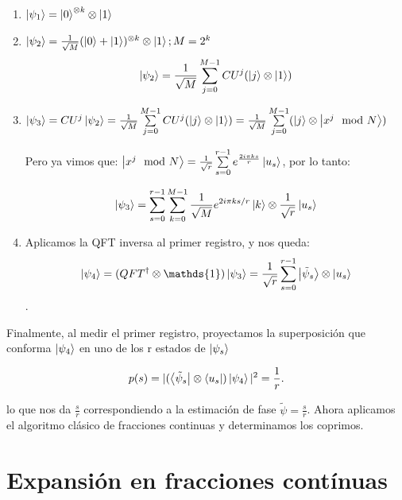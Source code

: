 \begin{enumerate}
    \item $\ket{\psi_1} = \ket{0}^{\otimes k} \otimes \ket{1}$
    \item $\ket{\psi_2} = \frac{1}{\sqrt{M}} (\ket{0} + \ket{1})^{\otimes k} \otimes \ket{1}; M=2^k$
        \begin{equation}
            \ket{\psi_2} = \frac{1}{\sqrt{M}} \sum_{j=0}^{M-1} CU^j (\ket{j} \otimes \ket{1})
        \end{equation}
    \item $\ket{\psi_3} = CU^j \ket{\psi_2} = \frac{1}{\sqrt{M}} \sum\limits_{j=0}^{M-1} CU^j (\ket{j} \otimes \ket{1}) = \frac{1}{\sqrt{M}} \sum\limits_{j=0}^{M-1} (\ket{j} \otimes \ket{x^j \mod N})$

        Pero ya vimos que: $\ket{x^j \mod N} = \frac{1}{\sqrt{r}} \sum\limits_{s=0}^{r-1} e^{\frac{2 i \pi k s}{r}} \ket{u_s}$, por lo tanto:

        \begin{equation}
            \ket{\psi_3} = \sum\limits_{s=0}^{r-1}\sum_{k=0}^{M-1} \frac{1}{\sqrt{M}} e^{2 i \pi k s/r} \ket{k} \otimes \frac{1}{\sqrt{r}} \ket{u_s}
        \end{equation}

    \item Aplicamos la QFT inversa al primer registro, y nos queda:
        \begin{equation}
            \ket{\psi_4} = (QFT^\dagger \otimes \mathds{1}) \ket{\psi_3} = \frac{1}{\sqrt{r}} \sum\limits_{s=0}^{r-1} \ket{\tilde{\psi}_s} \otimes \ket{u_s}
        \end{equation} .
\end{enumerate}

Finalmente, al medir el primer registro, proyectamos la superposición que conforma $\ket{\psi_4}$ en uno de los r estados de $\ket{\psi_s}$

\begin{equation}
    p(s) = |(\bra{\tilde{\psi}_s} \otimes \bra{u_s}) \ket{\psi_4}|^2 = \frac{1}{r} .
\end{equation}

lo que nos da $\frac{s}{r}$ correspondiendo a la estimación de fase $\tilde{\psi} = \frac{s}{r}$. Ahora aplicamos el algoritmo clásico de fracciones continuas y determinamos los coprimos.

\section{Expansión en fracciones contínuas}

